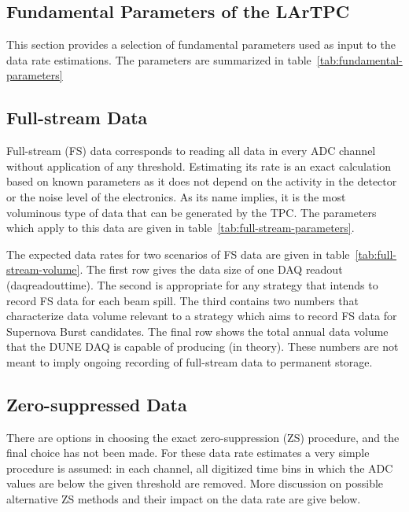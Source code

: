 \subsection{Fundamental Parameters of the LArTPC}

This section provides a selection of fundamental parameters used as
input to the data rate estimations.
The parameters are summarized in
table~\ref{tab:fundamental-parameters}

%

\subsection{Full-stream Data}

Full-stream (FS) data corresponds to reading all data in every ADC channel without application of any threshold.
Estimating its rate is an exact calculation based on known parameters as it does not depend on
the activity in the detector or the noise level of the electronics.
As its name implies, it is the most voluminous type of data that can be generated by the TPC.
The parameters which apply to this data are given in table~\ref{tab:full-stream-parameters}.

%

The expected data rates for two scenarios of FS data are given
in table~\ref{tab:full-stream-volume}.
The first row gives the data size of one DAQ readout (daqreadouttime).
The second is appropriate for any strategy that intends to record FS
data for each beam spill.
The third contains two numbers that characterize data volume relevant to a strategy which aims to record FS data
for Supernova Burst candidates.
The final row  shows the total annual data volume that the DUNE DAQ is capable of producing (in theory).
These numbers are not meant to imply ongoing recording of full-stream
data to permanent storage.

%

\subsection{Zero-suppressed Data}

There are options in choosing the exact zero-suppression (ZS) procedure,
and the final choice has not been made.
For these data rate estimates a very simple procedure is assumed: in each
channel, all digitized time bins in which the ADC values are below
the given threshold are removed.
More discussion on possible alternative ZS methods and their impact on
the data rate are give below.

